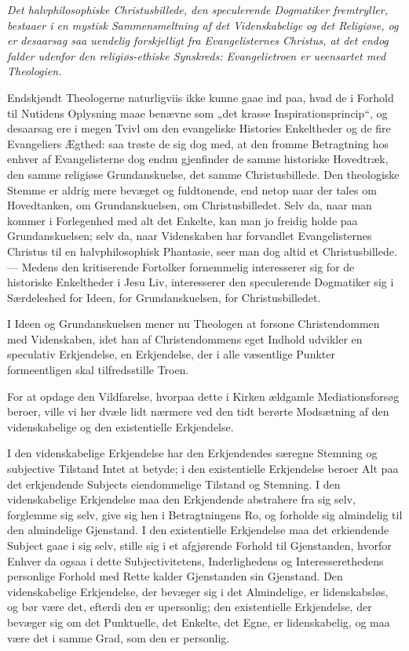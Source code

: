 \documentclass[12pt,a4paper]{book}
\newcommand{\opage}[1]{\marginnote{\footnotesize\textit{[#1]}}}
\begin{document}
\begin{center}\itshape
Det halvphilosophiske Christusbillede, den speculerende Dogmatiker
fremtryller, bestaaer i en mystisk Sammensmeltning af det Videnskabelige
og det Religiøse, og er desaarsag saa uendelig forskjelligt fra
Evangelisternes Christus, at det endog falder udenfor den religiøs-ethiske
Synskreds: Evangelietroen er ueensartet med Theologien.
\end{center}

\opage{97} Endskjøndt Theologerne naturligviis ikke kunne gaae ind paa, hvad de i
Forhold til Nutidens Oplysning maae benævne som „det krasse
Inspirationsprincip“, og desaarsag ere i megen Tvivl om den evangeliske
Histories Enkeltheder og de fire Evangeliers Ægthed: saa trøste de sig dog
med, at den fromme Betragtning hos enhver af Evangelisterne dog endnu
gjenfinder de samme historiske Hovedtræk, den samme religiøse
Grundanskuelse, det samme Christusbillede. Den theologiske Stemme er aldrig
mere bevæget og fuldtonende, end netop naar der tales om Hovedtanken, om
Grundanskuelsen, om Christusbilledet. Selv da, naar man kommer i
Forlegenhed med alt det Enkelte, kan man jo freidig holde paa
Grundanskuelsen; selv da, naar Videnskaben har forvandlet Evangelisternes
Christus til en halvphilosophisk Phantasie, seer man dog altid et
Christusbillede. --- Medens den kritiserende Fortolker fornemmelig
interesserer sig for de historiske Enkeltheder i Jesu Liv, interesserer den
speculerende Dogmatiker sig i Særdeleshed for Ideen, for Grundanskuelsen,
for Christusbilledet.

\opage{98} I Ideen og Grundanskuelsen mener nu Theologen at forsone Christendommen med
Videnskaben, idet han af Christendommens eget Indhold udvikler en
speculativ Erkjendelse, en Erkjendelse, der i alle væsentlige Punkter
formeentligen skal tilfredsstille Troen.

For at opdage den Vildfarelse, hvorpaa dette i Kirken ældgamle
Mediationsforsøg beroer, ville vi her dvæle lidt nærmere ved den tidt
berørte Modsætning af den videnskabelige og den existentielle Erkjendelse.

I den videnskabelige Erkjendelse har den Erkjendendes særegne Stemning og
subjective Tilstand Intet at betyde; i den existentielle Erkjendelse beroer
Alt paa det erkjendende Subjects eiendommelige Tilstand og Stemning. I den
videnskabelige Erkjendelse maa den Erkjendende abstrahere fra sig selv,
forglemme sig selv, give sig hen i Betragtningens Ro, og forholde sig
almindelig til den almindelige Gjenstand. I den existentielle Erkjendelse
maa det erkiendende Subject gaae i sig selv, stille sig i et afgjørende
Forhold til Gjenstanden, hvorfor Enhver da ogsaa i dette Subjectivitetens,
Inderlighedens og Interesserethedens personlige Forhold med Rette kalder
Gjenstanden sin Gjenstand. Den videnskabelige Erkjendelse, der bevæger sig
i det Almindelige, er lidenskabsløs, og bør være det, efterdi den er
upersonlig; den existentielle Erkjendelse, der bevæger sig om det
Punktuelle, det Enkelte, det Egne, er lidenskabelig, og maa være det i
samme Grad, som den er personlig.
\end{document}
